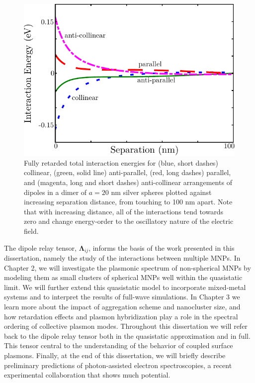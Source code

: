 \documentclass [11pt, proquest] {uwthesis}[2016/11/22]
\begin{document}
\begin{figure}
\begin{centering}
\includegraphics{dimer_ret_total.pdf}
\caption{Fully retarded total interaction energies for (blue, short dashes) collinear, (green, solid line) anti-parallel, (red, long dashes) parallel, and (magenta, long and short dashes) anti-collinear arrangements of dipoles in a dimer of $a=20$ nm silver spheres plotted against increasing separation distance, from touching to 100 nm apart. Note that with increasing distance, all of the interactions tend towards zero and change energy-order to the oscillatory nature of the electric field.}
\label{dimer_ret_tot}
\end{centering}
\end{figure}

The dipole relay tensor, $\boldsymbol{\Lambda}_{ij}$, informs the basis of the work presented in this dissertation, namely the study of the interactions between multiple MNPs. In Chapter 2, we will investigate the plasmonic spectrum of non-spherical MNPs by modeling them as small clusters of spherical MNPs well within the quasistatic limit. We will further extend this quasistatic model to incorporate mixed-metal systems and to interpret the results of full-wave simulations. In Chapter 3 we learn more about the impact of aggregation scheme and nanocluster size, and how retardation effects and plasmon hybridization play a role in the spectral ordering of collective plasmon modes. Throughout this dissertation we will refer back to the dipole relay tensor both in the quasistatic approximation and in full. This tensor central to the understanding of the behavior of coupled surface plasmons. Finally, at the end of this dissertation, we will briefly describe preliminary predictions of photon-assisted electron spectroscopies, a recent experimental collaboration that shows much potential.
\newpage
\end{document}
